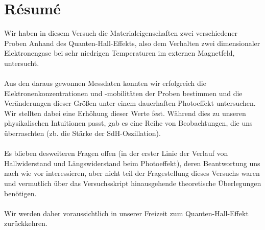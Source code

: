 \section{R\'esum\'e}
Wir haben in diesem Versuch die Materialeigenschaften zwei verschiedener Proben Anhand des Quanten-Hall-Effekts, also dem Verhalten zwei dimensionaler Elektronengase bei sehr niedrigen Temperaturen im externen Magnetfeld, untersucht. \\
\\
Aus den daraus gewonnen Messdaten konnten wir erfolgreich die Elektronenkonzentrationen und -mobilitäten der Proben bestimmen und die Veränderungen dieser Größen unter einem dauerhaften Photoeffekt untersuchen. Wir stellten dabei eine Erhöhung dieser Werte fest. 
Während dies zu unseren physikalischen Intuitionen passt, gab es eine Reihe von Beobachtungen, die uns überraschten (zb. die Stärke der SdH-Oszillation). \\
\\
Es blieben desweiteren Fragen offen (in der erster Linie der Verlauf von Hallwiderstand und Längswiderstand beim Photoeffekt), deren Beantwortung uns nach wie vor interessieren, aber nicht teil der Fragestellung dieses Versuchs waren und vermutlich über das Versuchsskript hinausgehende theoretische Überlegungen benötigen.\\
\\
Wir werden daher voraussichtlich in unserer Freizeit zum Quanten-Hall-Effekt zurückkehren. 
